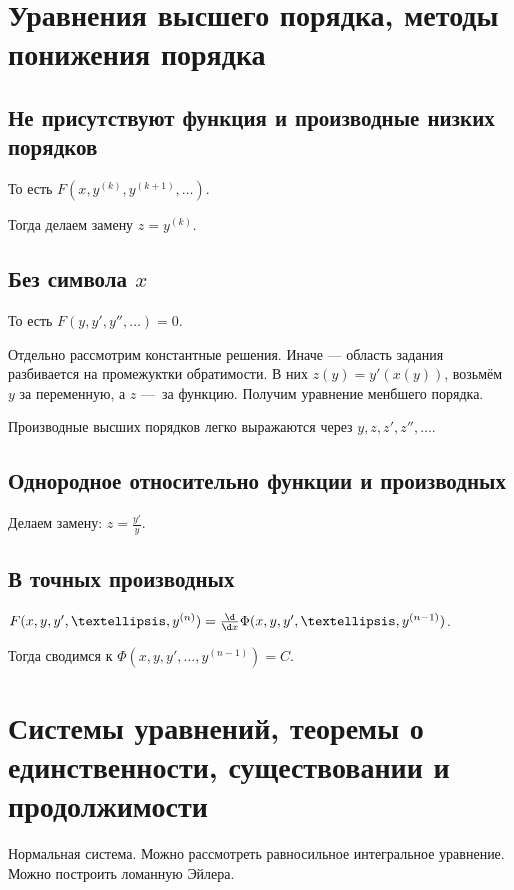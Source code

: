 \documentclass[12pt, a4paper]{article}
\begin{document}
\section{Уравнения высшего порядка, методы понижения порядка}

\subsection{Не присутствуют функция и производные низких порядков}

То есть $F(x, y^{(k)}, y^{(k + 1)}, …)$.

Тогда делаем замену $z = y^{(k)}$.

\subsection{Без символа $x$}

То есть $F(y, y', y'', …) = 0$.

Отдельно рассмотрим константные решения. Иначе — область задания разбивается на промежуктки обратимости.
В них $z(y) = y'(x(y))$, возьмём $y$ за переменную, а $z$ — за функцию. Получим уравнение менбшего порядка.

Производные высших порядков легко выражаются через $y, z, z', z'', …$.


\subsection{Однородное относительно функции и производных}

Делаем замену: $z = \frac{y'}{y}$.

\subsection{В точных производных}

$F(x, y, y', …, y^{(n)}) = \frac{\d}{\d x} \Phi(x, y, y', …, y^{(n - 1)})$.

Тогда сводимся к $\Phi(x, y, y', …, y^{(n - 1)}) = C$.



\section{Системы уравнений, теоремы о единственности, существовании и продолжимости}

Нормальная система. Можно рассмотреть равносильное интегральное уравнение. Можно построить ломанную Эйлера.
\end{document}
